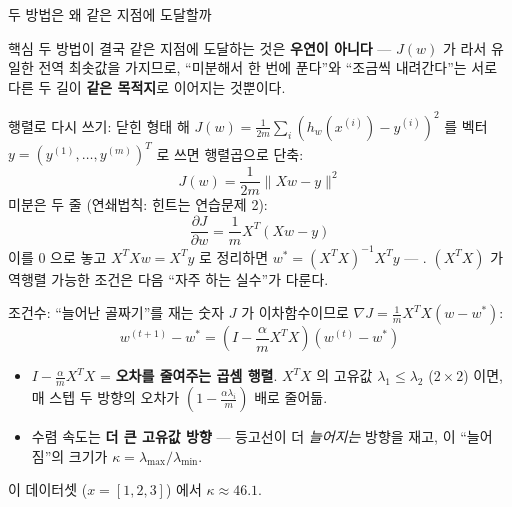 \documentclass[aspectratio=169,11pt]{beamer}
\begin{document}
\begin{frame}{두 방법은 왜 같은 지점에 도달할까}
  \begin{block}{핵심}
    두 방법이 결국 같은 지점에 도달하는 것은 \textbf{우연이 아니다} ---
    $J(w)$ 가 라서 유일한 전역 최솟값을 가지므로,
    ``미분해서 한 번에 푼다''와 ``조금씩 내려간다''는 서로 다른
    두 길이 \textbf{같은 목적지}로 이어지는 것뿐이다.
  \end{block}
\end{frame}

\begin{frame}{행렬로 다시 쓰기: 닫힌 형태 해}
  $J(w) = \frac{1}{2m}\sum_i (h_w(x^{(i)}) - y^{(i)})^2$ 를 벡터
  $y = (y^{(1)}, \ldots, y^{(m)})^T$ 로 쓰면 행렬곱으로 단축:
  \[
  J(w) = \frac{1}{2m} \|Xw - y\|^2
  \]
  미분은 두 줄 (연쇄법칙: 힌트는 연습문제 2):
  \[
  \frac{\partial J}{\partial w} = \frac{1}{m} X^T(Xw - y)
  \]
  이를 $0$ 으로 놓고 $X^TXw = X^Ty$ 로 정리하면
  $w^{*} = (X^TX)^{-1}X^Ty$ --- .
  $(X^TX)$ 가 역행렬 가능한 조건은 다음 ``자주 하는 실수''가 다룬다.
\end{frame}


\begin{frame}{조건수: ``늘어난 골짜기''를 재는 숫자}
  $J$ 가 이차함수이므로 $\nabla J = \frac{1}{m}X^TX(w - w^{*})$:
  \[
  w^{(t+1)} - w^{*} = \left(I - \frac{\alpha}{m}X^TX\right)(w^{(t)} - w^{*})
  \]
  \begin{itemize}
    \item $I - \frac{\alpha}{m}X^TX$ = \textbf{오차를 줄여주는 곱셈
      행렬}. $X^TX$ 의 고유값 $\lambda_1 \le \lambda_2$ ($2 \times 2$)
      이면, 매 스텝 두 방향의 오차가 $(1 - \frac{\alpha \lambda_i}{m})$
      배로 줄어듦.
    \item 수렴 속도는 \textbf{더 큰 고유값 방향} --- 등고선이 더
      \emph{늘어지는} 방향을 재고, 이 ``늘어짐''의 크기가 
      $\kappa = \lambda_{\max}/\lambda_{\min}$.
  \end{itemize}
  이 데이터셋 ($x=[1,2,3]$) 에서 $\kappa \approx 46.1$.
\end{frame}
\end{document}
